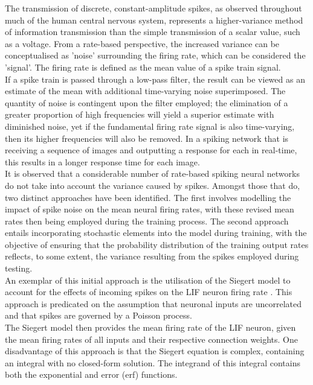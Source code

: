 \noindent The transmission of discrete, constant-amplitude spikes, as observed throughout much of the human central nervous system, represents a higher-variance method of information transmission than the simple transmission of a scalar value, such as a voltage. From a rate-based perspective, the increased variance can be conceptualised as 'noise' surrounding the firing rate, which can be considered the 'signal'. The firing rate is defined as the mean value of a spike train signal.\\

\noindent If a spike train is passed through a low-pass filter, the result can be viewed as an estimate of the mean with additional time-varying noise superimposed. The quantity of noise is contingent upon the filter employed; the elimination of a greater proportion of high frequencies will yield a superior estimate with diminished noise, yet if the fundamental firing rate signal is also time-varying, then its higher frequencies will also be removed. In a spiking network that is receiving a sequence of images and outputting a response for each in real-time, this results in a longer response time for each image. \\

\noindent It is observed that a considerable number of rate-based spiking neural networks do not take into account the variance caused by spikes. Amongst those that do, two distinct approaches have been identified. The first involves modelling the impact of spike noise on the mean neural firing rates, with these revised mean rates then being employed during the training process. The second approach entails incorporating stochastic elements into the model during training, with the objective of ensuring that the probability distribution of the training output rates reflects, to some extent, the variance resulting from the spikes employed during testing. \\

\noindent An exemplar of this initial approach is the utilisation of the Siegert model to account for the effects of incoming spikes on the LIF neuron firing rate \cite{o2013real}. This approach is predicated on the assumption that neuronal inputs are uncorrelated and that spikes are governed by a Poisson process. \\

\noindent The Siegert model then provides the mean firing rate of the LIF neuron, given the mean firing rates of all inputs and their respective connection weights. One disadvantage of this approach is that the Siegert equation is complex, containing an integral with no closed-form solution. The integrand of this integral contains both the exponential and error (erf) functions.\\

